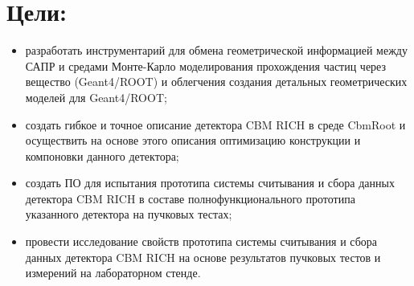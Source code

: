 \section*{Цели:}

\begin{itemize}
\item{разработать инструментарий для обмена геометрической информацией между САПР и средами Монте-Карло моделирования прохождения частиц через вещество (Geant4/ROOT) и облегчения создания детальных геометрических моделей для Geant4/ROOT;}
\item{создать гибкое и точное описание детектора CBM RICH в среде CbmRoot и осуществить на основе этого описания оптимизацию конструкции и компоновки данного детектора;}
\item{создать ПО для испытания прототипа системы считывания и сбора данных детектора CBM RICH в составе полнофункционального прототипа указанного детектора на пучковых тестах;}
\item{провести исследование свойств прототипа системы считывания и сбора данных детектора CBM RICH на основе результатов пучковых тестов и измерений на лабораторном стенде.}
\end{itemize}
